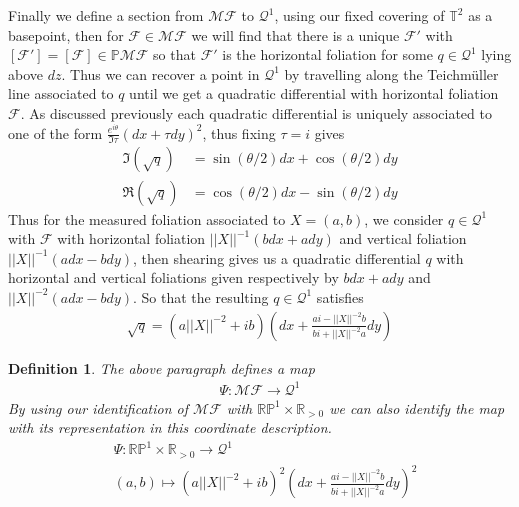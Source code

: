 \documentclass{article}
\newtheorem{defn}{Definition}
\newcommand{\norm}[1]{\lvert\lvert#1\rvert\rvert}
\begin{document}
        Finally we define a section from \(\mathscr{MF}\) to \(\mathcal{Q}^1\), using our fixed covering of \(\mathbb{T}^2\) as a basepoint, then for \(\mathcal{F} \in \mathscr{MF}\) we will find that there is a unique \(\mathcal{F}'\) with \([\mathcal{F}'] = [\mathcal{F}] \in \mathbb{P}\mathscr{MF}\) so that \(\mathcal{F}'\) is the horizontal foliation for some \(q \in \mathcal{Q}^1\) lying above \(dz\). Thus we can recover a point in \(\mathcal{Q}^1\) by travelling along the Teichm\"uller line associated to \(q\) until we get a quadratic differential with horizontal foliation \(\mathcal{F}\). As discussed previously each quadratic differential is uniquely associated to one of the form \(\frac{e^{i\theta}}{\Im\tau}(dx + \tau dy)^2\), thus fixing \(\tau = i\) gives
        \begin{align*}
            \Im(\sqrt{q}) &= \sin(\theta/2)dx + \cos(\theta/2)dy\\
            \Re(\sqrt{q}) &= \cos(\theta/2)dx - \sin(\theta/2)dy
        \end{align*}
        Thus for the measured foliation associated to \(X = (a,b)\), we consider \(q \in \mathcal{Q}^1\) with \(\mathcal{F}\) with horizontal foliation \(\norm{X}^{-1}(bdx + ady)\) and vertical foliation \(\norm{X}^{-1}(adx - bdy)\), then shearing gives us a quadratic differential \(q\) with horizontal and vertical foliations given respectively by \(bdx + ady\) and \(\norm{X}^{-2}(adx - bdy)\). So that the resulting \(q \in \mathcal{Q}^1\) satisfies
        \begin{align*}
            \sqrt{q} = (a\norm{X}^{-2} + ib)\left(dx + \frac{ai - \norm{X}^{-2}b}{bi + \norm{X}^{-2}a}dy\right)
        \end{align*}
        \begin{defn}
            The above paragraph defines a map
            \begin{align*}
                \Psi: \mathscr{MF} \to \mathcal{Q}^1
            \end{align*}
            By using our identification of \(\mathscr{MF}\) with \(\mathbb{RP}^1 \times \mathbb{R}_{>0}\) we can also identify the map with its representation in this coordinate description.
            \begin{align*}
                &\Psi: \mathbb{RP}^1 \times \mathbb{R}_{>0} \to \mathcal{Q}^1 \\
                &(a,b) \mapsto (a\norm{X}^{-2} + ib)^2\left(dx + \frac{ai - \norm{X}^{-2}b}{bi + \norm{X}^{-2}a}dy\right)^2
            \end{align*}
        \end{defn}
\end{document}
